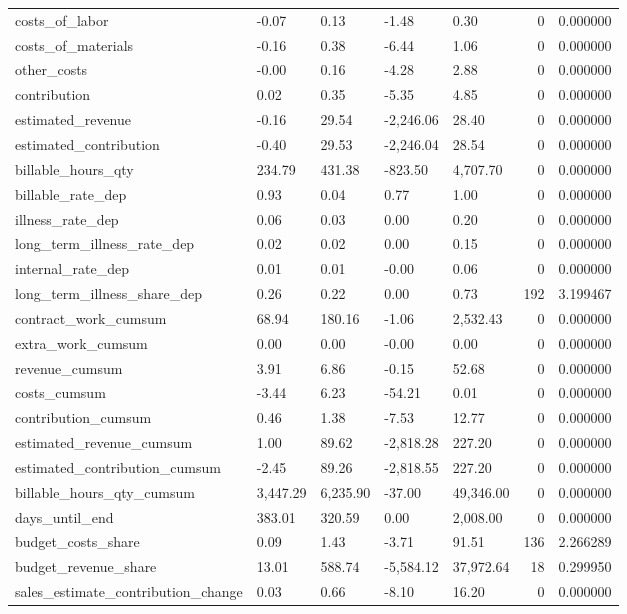 \begin{landscape}
\begin{longtable}[h!]{lllllrr}
costs_of_labor & -0.07 & 0.13 & -1.48 & 0.30 & 0 & 0.000000 \\
costs_of_materials & -0.16 & 0.38 & -6.44 & 1.06 & 0 & 0.000000 \\
other_costs & -0.00 & 0.16 & -4.28 & 2.88 & 0 & 0.000000 \\
contribution & 0.02 & 0.35 & -5.35 & 4.85 & 0 & 0.000000 \\
estimated_revenue & -0.16 & 29.54 & -2,246.06 & 28.40 & 0 & 0.000000 \\
estimated_contribution & -0.40 & 29.53 & -2,246.04 & 28.54 & 0 & 0.000000 \\
billable_hours_qty & 234.79 & 431.38 & -823.50 & 4,707.70 & 0 & 0.000000 \\
billable_rate_dep & 0.93 & 0.04 & 0.77 & 1.00 & 0 & 0.000000 \\
illness_rate_dep & 0.06 & 0.03 & 0.00 & 0.20 & 0 & 0.000000 \\
long_term_illness_rate_dep & 0.02 & 0.02 & 0.00 & 0.15 & 0 & 0.000000 \\
internal_rate_dep & 0.01 & 0.01 & -0.00 & 0.06 & 0 & 0.000000 \\
long_term_illness_share_dep & 0.26 & 0.22 & 0.00 & 0.73 & 192 & 3.199467 \\
contract_work_cumsum & 68.94 & 180.16 & -1.06 & 2,532.43 & 0 & 0.000000 \\
extra_work_cumsum & 0.00 & 0.00 & -0.00 & 0.00 & 0 & 0.000000 \\
revenue_cumsum & 3.91 & 6.86 & -0.15 & 52.68 & 0 & 0.000000 \\
costs_cumsum & -3.44 & 6.23 & -54.21 & 0.01 & 0 & 0.000000 \\
contribution_cumsum & 0.46 & 1.38 & -7.53 & 12.77 & 0 & 0.000000 \\
estimated_revenue_cumsum & 1.00 & 89.62 & -2,818.28 & 227.20 & 0 & 0.000000 \\
estimated_contribution_cumsum & -2.45 & 89.26 & -2,818.55 & 227.20 & 0 & 0.000000 \\
billable_hours_qty_cumsum & 3,447.29 & 6,235.90 & -37.00 & 49,346.00 & 0 & 0.000000 \\
days_until_end & 383.01 & 320.59 & 0.00 & 2,008.00 & 0 & 0.000000 \\
budget_costs_share & 0.09 & 1.43 & -3.71 & 91.51 & 136 & 2.266289 \\
budget_revenue_share & 13.01 & 588.74 & -5,584.12 & 37,972.64 & 18 & 0.299950 \\
sales_estimate_contribution_change & 0.03 & 0.66 & -8.10 & 16.20 & 0 & 0.000000 \\

\end{longtable}
\end{landscape}
